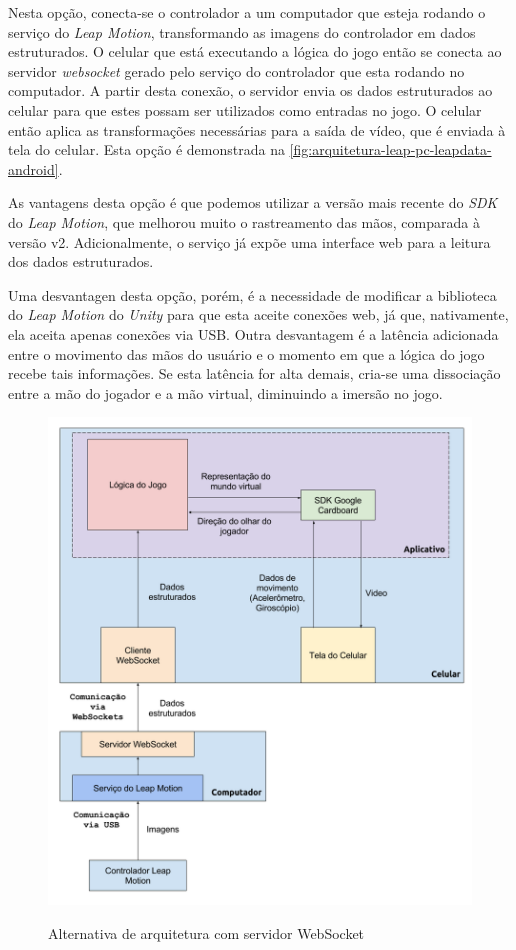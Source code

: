 Nesta opção, conecta-se o controlador a um computador que esteja rodando o 
serviço do \textit{Leap Motion}, transformando as imagens do controlador em 
dados estruturados. O celular que está executando a lógica do jogo então se
conecta ao servidor \textit{websocket} gerado pelo serviço do controlador que 
esta rodando no computador. A partir desta conexão, o servidor envia os
dados estruturados ao celular para que estes possam ser utilizados como 
entradas no jogo. O celular então aplica as transformações necessárias para 
a saída de vídeo, que é enviada à tela do celular.
Esta opção é demonstrada na \autoref{fig:arquitetura-leap-pc-leapdata-android}.

As vantagens desta opção é que podemos utilizar a versão mais recente 
do \textit{SDK} do \textit{Leap Motion}, que melhorou muito o rastreamento das 
mãos, comparada à versão v2. Adicionalmente, o serviço já expõe uma interface 
web para a leitura dos dados estruturados. 

Uma desvantagen desta opção, porém, é a necessidade de modificar a biblioteca 
do \textit{Leap Motion} do \textit{Unity} para que esta aceite conexões web, já 
que, nativamente, ela aceita apenas conexões via USB. Outra desvantagem é a 
latência adicionada entre o movimento das mãos do usuário e o momento em que 
a lógica do jogo recebe tais informações. Se esta latência for alta demais, 
cria-se uma dissociação entre a mão do jogador e a mão virtual, diminuindo a imersão no jogo.

\begin{figure}[h]
	\centering
	\caption{Alternativa de arquitetura com servidor WebSocket}
	\includegraphics[width=0.7\linewidth]{images/Arquitetura-leap-pc-leapdata-android}
	\legend{\fonteAP}
	\label{fig:arquitetura-leap-pc-leapdata-android}
\end{figure}

